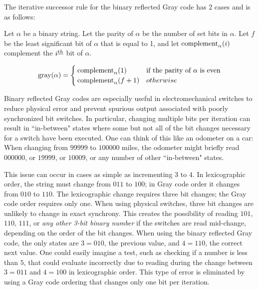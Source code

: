 The iterative successor rule for the binary reflected Gray code has 2 cases and is as follows:


Let $\alpha$ be a binary string.  Let the parity of $\alpha$ be the number of set bits in $\alpha$.  Let $f$ be the least significant bit of $\alpha$ that is equal to 1, and let $\complementbit[\alpha]{i}$ complement the $i\thh$ bit of $\alpha$.  

\begin{equation} \label{eq:BRGC-rule}
    \text{gray}(\alpha) = \begin{cases} 
        \complementbit[\alpha]{1} & \text{if the parity of $\alpha$ is even}\\
        \complementbit[\alpha]{f+1} & otherwise\\
\end{cases}
\end{equation}

Binary reflected Gray codes are especially useful in electromechanical switches to reduce physical error and prevent spurious output associated with poorly synchronized bit switches.  In particular, changing multiple bits per iteration can result in ``in-between" states where some but not all of the bit changes necessary for a switch have been executed.  One can think of this like an odometer on a car: When changing from $99999$ to $100000$ miles, the odometer might briefly read $000000$, or $19999$, or $10009$, or any number of other ``in-between" states. 

This issue can occur in cases as simple as incrementing $3$ to $4$.  In lexicographic order, the string must change from $011$ to $100$; in Gray code order it changes from $010$ to $110$.  The lexicographic change requires three bit changes; the Gray code order requires only one.  When using physical switches, three bit changes are unlikely to change in exact synchrony.  This creates the possibility of reading $101$, $110$, $111$, or \emph{any other 3-bit binary number} if the switches are read mid-change, depending on the order of the bit changes.  When using the binary reflected Gray code, the only states are $3=010$, the previous value, and $4=110$, the correct next value. One could easily imagine a test, such as checking if a number is less than $5$, that could evaluate incorrectly due to reading during the change between $3=011$ and $4=100$ in lexicographic order.  This type of error is eliminated by using a Gray code ordering that changes only one bit per iteration.


